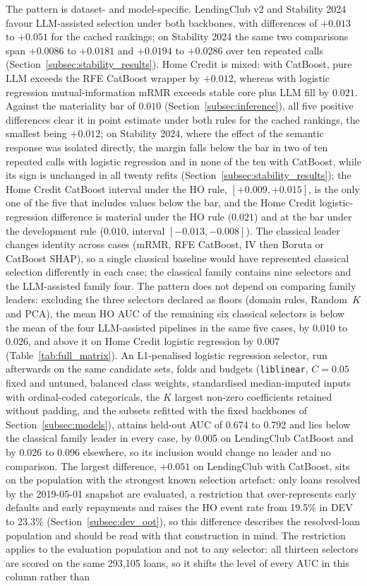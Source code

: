 \documentclass[final,5p,twocolumn]{elsarticle}
\newcommand{\Kfeat}{K}
\begin{document}
The pattern is dataset- and model-specific. LendingClub v2 and Stability 2024 favour LLM-assisted selection under both backbones, with differences of $+0.013$ to $+0.051$ for the cached rankings; on Stability 2024 the same two comparisons span $+0.0086$ to $+0.0181$ and $+0.0194$ to $+0.0286$ over ten repeated calls (Section~\ref{subsec:stability_results}). Home Credit is mixed: with CatBoost, pure LLM exceeds the RFE CatBoost wrapper by $+0.012$, whereas with logistic regression mutual-information mRMR exceeds stable core plus LLM fill by $0.021$. Against the materiality bar of $0.010$ (Section~\ref{subsec:inference}), all five positive differences clear it in point estimate under both rules for the cached rankings, the smallest being $+0.012$; on Stability 2024, where the effect of the semantic response was isolated directly, the margin falls below the bar in two of ten repeated calls with logistic regression and in none of the ten with CatBoost, while its sign is unchanged in all twenty refits (Section~\ref{subsec:stability_results}); the Home Credit CatBoost interval under the HO rule, $[+0.009, +0.015]$, is the only one of the five that includes values below the bar, and the Home Credit logistic-regression difference is material under the HO rule ($0.021$) and at the bar under the development rule ($0.010$, interval $[-0.013, -0.008]$). The classical leader changes identity across cases (mRMR, RFE CatBoost, IV then Boruta or CatBoost SHAP), so a single classical baseline would have represented classical selection differently in each case; the classical family contains nine selectors and the LLM-assisted family four. The pattern does not depend on comparing family leaders: excluding the three selectors declared as floors (domain rules, Random~$\Kfeat$ and PCA), the mean HO AUC of the remaining six classical selectors is below the mean of the four LLM-assisted pipelines in the same five cases, by $0.010$ to $0.026$, and above it on Home Credit logistic regression by $0.007$ (Table~\ref{tab:full_matrix}). An L1-penalised logistic regression selector, run afterwards on the same candidate sets, folds and budgets (\texttt{liblinear}, $C=0.05$ fixed and untuned, balanced class weights, standardised median-imputed inputs with ordinal-coded categoricals, the $\Kfeat$ largest non-zero coefficients retained without padding, and the subsets refitted with the fixed backbones of Section~\ref{subsec:models}), attains held-out AUC of 0.674 to 0.792 and lies below the classical family leader in every case, by 0.005 on LendingClub CatBoost and by 0.026 to 0.096 elsewhere, so its inclusion would change no leader and no comparison. The largest difference, $+0.051$ on LendingClub with CatBoost, sits on the population with the strongest known selection artefact: only loans resolved by the 2019-05-01 snapshot are evaluated, a restriction that over-represents early defaults and early repayments and raises the HO event rate from 19.5\% in DEV to 23.3\% (Section~\ref{subsec:dev_oot}), so this difference describes the resolved-loan population and should be read with that construction in mind. The restriction applies to the evaluation population and not to any selector: all thirteen selectors are scored on the same 293,105 loans, so it shifts the level of every AUC in this column rather than 
\end{document}
